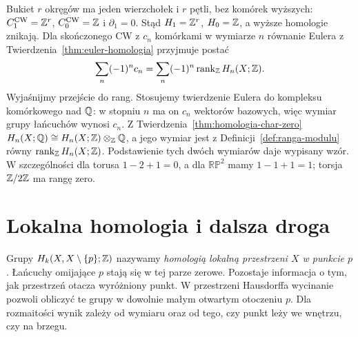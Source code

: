 \begin{przyklad}
\label{prz:homologia-bukiet}
Bukiet $r$ okręgów ma jeden
wierzchołek i $r$ pętli,
bez komórek wyższych:
$C_1^{\mathrm{CW}}=\mathbb{Z}^r$,
$C_0^{\mathrm{CW}}=\mathbb{Z}$ i
$\partial_1=0$.
Stąd $H_1=\mathbb{Z}^r$, $H_0=\mathbb{Z}$,
a wyższe homologie znikają.
Dla skończonego CW z
$c_n$ komórkami w wymiarze $n$
równanie Eulera z
Twierdzenia~\ref{thm:euler-homologia}
przyjmuje postać
\[
 \sum_n(-1)^n c_n
 =\sum_n(-1)^n
   \operatorname{rank}_{\mathbb{Z}} H_n(X;\mathbb{Z}).
\]
Wyjaśnijmy przejście do rang. Stosujemy twierdzenie Eulera
do kompleksu komórkowego nad $\mathbb{Q}$:
w stopniu $n$ ma on $c_n$ wektorów bazowych,
więc wymiar grupy łańcuchów wynosi $c_n$.
Z Twierdzenia~\ref{thm:homologia-char-zero}
$H_n(X;\mathbb{Q})\cong H_n(X;\mathbb{Z})\otimes_{\mathbb{Z}}\mathbb{Q}$,
a jego wymiar jest z Definicji~\ref{def:ranga-modulu}
równy $\operatorname{rank}_{\mathbb{Z}}H_n(X;\mathbb{Z})$.
Podstawienie tych dwóch wymiarów daje wypisany wzór.
W szczególności dla torusa
$1-2+1=0$, a dla
$\mathbb{RP}^2$ mamy
$1-1+1=1$; torsja
$\mathbb{Z}/2\mathbb{Z}$ ma rangę zero.
\end{przyklad}


\section{Lokalna homologia i dalsza droga}
\label{sec:lokalna-homologia}

Grupy $H_k(X,X\setminus\{p\};\mathbb{Z})$ nazywamy
\emph{homologią lokalną przestrzeni $X$ w punkcie $p$}.
Łańcuchy omijające $p$ stają się w tej parze zerowe.
Pozostaje informacja o tym, jak przestrzeń otacza wyróżniony punkt.
W przestrzeni Hausdorffa wycinanie pozwoli obliczyć te grupy
w dowolnie małym otwartym otoczeniu $p$. Dla rozmaitości wynik zależy od
wymiaru oraz od tego, czy punkt leży we wnętrzu, czy na brzegu.

